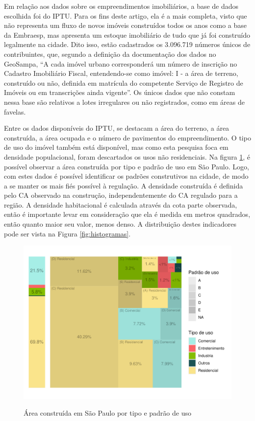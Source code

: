 Em relação aos dados sobre os empreendimentos imobiliários, a base de dados escolhida foi do IPTU. Para os fins deste artigo, ela é a mais completa, visto que não representa um fluxo de novos imóveis construídos todos os anos como a base da Embraesp, mas apresenta um estoque imobiliário de tudo que já foi construído legalmente na cidade. Dito isso, estão cadastrados os 3.096.719 números únicos de contribuintes, que, segundo a definição da documentação dos dados no GeoSampa, ``A cada imóvel urbano corresponderá um número de inscrição no Cadastro Imobiliário Fiscal, entendendo-se como imóvel: I - a área de terreno, construído ou não, definida em matrícula do competente Serviço de Registro de Imóveis ou em transcrições ainda vigente''. Os únicos dados que não constam nessa base são relativos a lotes irregulares ou não registrados, como em áreas de favelas. 

Entre os dados disponíveis do IPTU, se destacam a área do terreno, a área construída, a área ocupada e o número de pavimentos do empreendimento. O tipo de uso do imóvel também está disponível, mas como esta pesquisa foca em densidade populacional, foram descartados os usos não residenciais. Na figura \ref{fig:area_construida}, é possível observar a área construída por tipo e padrão de uso em São Paulo. Logo, com estes dados é possível identificar os padrões construtivos na cidade, de modo a se manter os mais fiés possível à regulação. A densidade construída é definida pelo CA observado na construção, independentemente do CA regulado para a região. A densidade habitacional é calculada através da cota parte observada, então é importante levar em consideração que ela é medida em metros quadrados, então quanto maior seu valor, menos denso. A distribuição destes indicadores pode ser vista na Figura \ref{fig:histogramas}.

\begin{figure}[h]
    \centering
    \caption{Área construída em São Paulo por tipo e padrão de uso}
    \includegraphics[width = .8\linewidth]{imagens/tree_area_construida.pdf}
    \label{fig:area_construida}
\end{figure}


